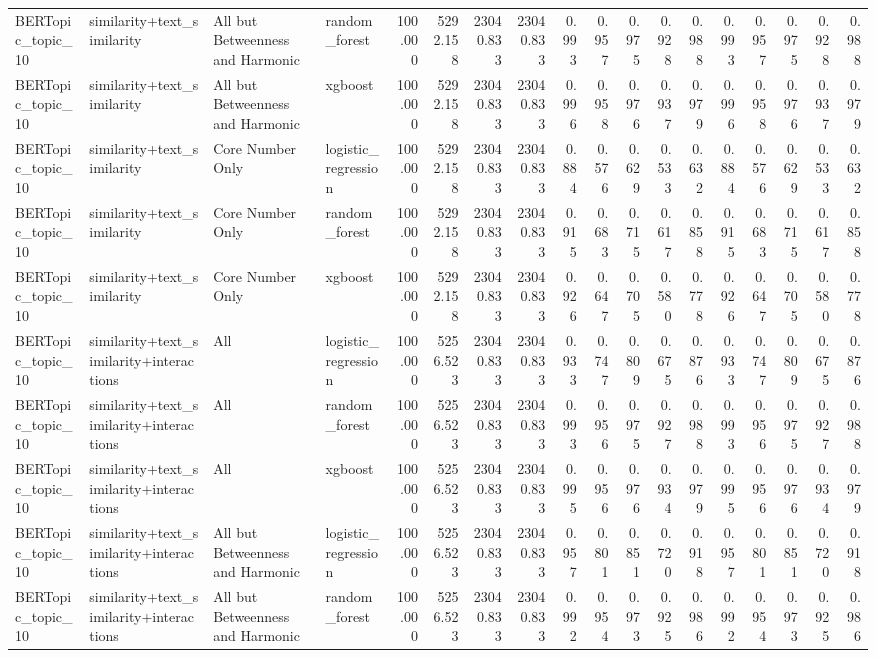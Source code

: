 \begin{tabular}{llllrrrrrrrrrrrrrr}
BERTopic\_topic\_10 & similarity+text\_similarity & All but Betweenness and Harmonic & random\_forest & 100.000 & 5292.158 & 23040.833 & 23040.833 & 0.993 & 0.957 & 0.975 & 0.928 & 0.988 & 0.993 & 0.957 & 0.975 & 0.928 & 0.988 \\
BERTopic\_topic\_10 & similarity+text\_similarity & All but Betweenness and Harmonic & xgboost & 100.000 & 5292.158 & 23040.833 & 23040.833 & 0.996 & 0.958 & 0.976 & 0.937 & 0.979 & 0.996 & 0.958 & 0.976 & 0.937 & 0.979 \\
BERTopic\_topic\_10 & similarity+text\_similarity & Core Number Only & logistic\_regression & 100.000 & 5292.158 & 23040.833 & 23040.833 & 0.884 & 0.576 & 0.629 & 0.533 & 0.632 & 0.884 & 0.576 & 0.629 & 0.533 & 0.632 \\
BERTopic\_topic\_10 & similarity+text\_similarity & Core Number Only & random\_forest & 100.000 & 5292.158 & 23040.833 & 23040.833 & 0.915 & 0.683 & 0.715 & 0.617 & 0.858 & 0.915 & 0.683 & 0.715 & 0.617 & 0.858 \\
BERTopic\_topic\_10 & similarity+text\_similarity & Core Number Only & xgboost & 100.000 & 5292.158 & 23040.833 & 23040.833 & 0.926 & 0.647 & 0.705 & 0.580 & 0.778 & 0.926 & 0.647 & 0.705 & 0.580 & 0.778 \\
BERTopic\_topic\_10 & similarity+text\_similarity+interactions & All & logistic\_regression & 100.000 & 5256.523 & 23040.833 & 23040.833 & 0.933 & 0.747 & 0.809 & 0.675 & 0.876 & 0.933 & 0.747 & 0.809 & 0.675 & 0.876 \\
BERTopic\_topic\_10 & similarity+text\_similarity+interactions & All & random\_forest & 100.000 & 5256.523 & 23040.833 & 23040.833 & 0.993 & 0.956 & 0.975 & 0.927 & 0.988 & 0.993 & 0.956 & 0.975 & 0.927 & 0.988 \\
BERTopic\_topic\_10 & similarity+text\_similarity+interactions & All & xgboost & 100.000 & 5256.523 & 23040.833 & 23040.833 & 0.995 & 0.956 & 0.976 & 0.934 & 0.979 & 0.995 & 0.956 & 0.976 & 0.934 & 0.979 \\
BERTopic\_topic\_10 & similarity+text\_similarity+interactions & All but Betweenness and Harmonic & logistic\_regression & 100.000 & 5256.523 & 23040.833 & 23040.833 & 0.957 & 0.801 & 0.851 & 0.720 & 0.918 & 0.957 & 0.801 & 0.851 & 0.720 & 0.918 \\
BERTopic\_topic\_10 & similarity+text\_similarity+interactions & All but Betweenness and Harmonic & random\_forest & 100.000 & 5256.523 & 23040.833 & 23040.833 & 0.992 & 0.954 & 0.973 & 0.925 & 0.986 & 0.992 & 0.954 & 0.973 & 0.925 & 0.986 \\

\end{tabular}
